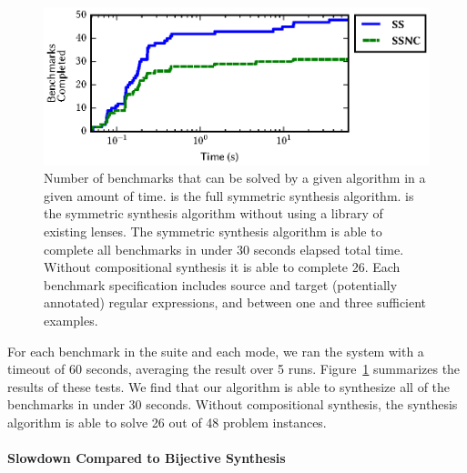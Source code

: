 \documentclass[12pt]{article}
\begin{document}
{\begin{figure}
  \centering
  \includegraphics{times}
  \vspace{-2ex}
  \caption{Number of
    benchmarks that can be solved by a given algorithm in a 
    given amount of time. \SSOpt{} is the full symmetric synthesis algorithm.
    \SSNCOpt{} is the symmetric synthesis algorithm without using a library of
    existing lenses. The symmetric synthesis algorithm is able to complete all
    benchmarks in under 30 seconds elapsed total time. Without compositional
    synthesis it is able to complete 26. Each benchmark specification includes
    source and target (potentially annotated) regular expressions, and between
    one and three sufficient examples.}
  \label{fig:times}
\end{figure}

For each benchmark in the suite and each mode, we ran the system with a timeout
of 60 seconds, averaging the result over 5 runs. Figure~\ref{fig:times}
summarizes the results of these tests. We find that our algorithm is able to
synthesize all of the benchmarks in under 30 seconds. Without compositional
synthesis, the synthesis algorithm is able to solve 26 out of 48 problem instances.


\paragraph*{Slowdown Compared to Bijective Synthesis}

}
\end{document}
